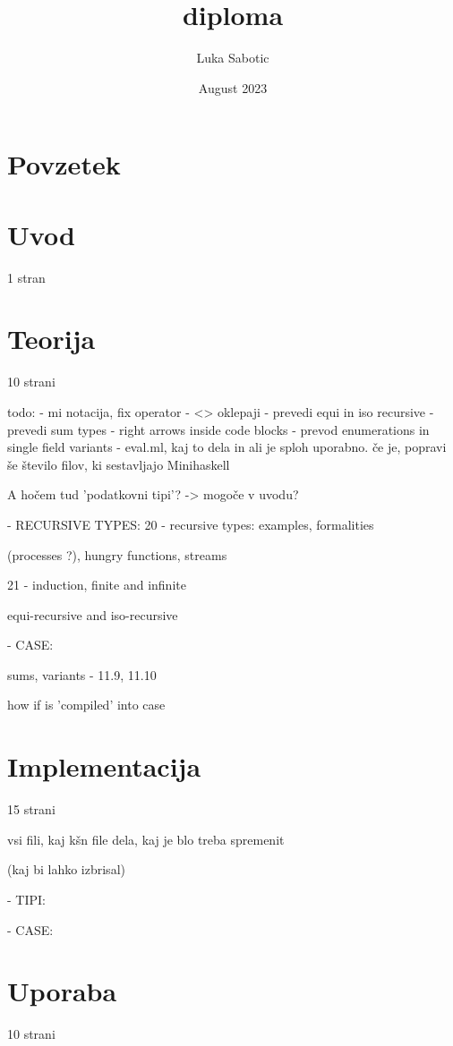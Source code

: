 \documentclass[a4paper]{report}
\title{diploma}
\author{Luka Sabotic}
\date{August 2023}
\begin{document}
\maketitle

\section{Povzetek}
\newpage

\section{Uvod}
1 stran
\newpage

\section{Teorija}
10 strani

todo: 
- mi notacija, fix operator
- <> oklepaji
- prevedi equi in iso recursive
- prevedi sum types
- right arrows inside code blocks
- prevod enumerations in single field variants
- eval.ml, kaj to dela in ali je sploh uporabno. če je, popravi še število filov, ki sestavljajo Minihaskell

A hočem tud 'podatkovni tipi'? -> mogoče v uvodu?

- RECURSIVE TYPES:  	20 - recursive types: examples, formalities

                        (processes ?), hungry functions, streams

    	            	21 - induction, finite and infinite

                        equi-recursive and iso-recursive

- CASE: 

        sums, variants -  11.9, 11.10

        how if is 'compiled' into case

\section{Implementacija}
15 strani

vsi fili, kaj kšn file dela, kaj je blo treba spremenit

(kaj bi lahko izbrisal)

- TIPI:

- CASE:

\section{Uporaba}
10 strani
\end{document}
